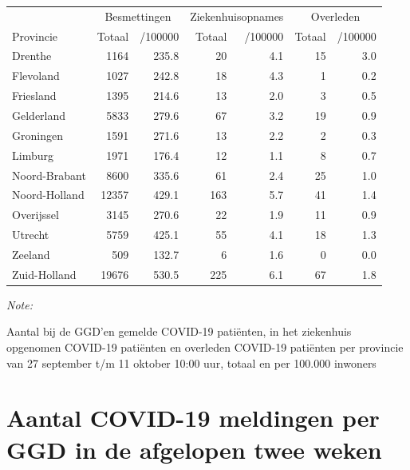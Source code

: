 \documentclass[
  english,
  man,floatsintext]{apa6}
\begin{document}
\begin{table}[H]
\centering
\begin{threeparttable}
\begin{tabular}{lrrrrrr}
\toprule
\multicolumn{1}{c}{ } & \multicolumn{2}{c}{Besmettingen} & \multicolumn{2}{c}{Ziekenhuisopnames} & \multicolumn{2}{c}{Overleden} \\
\cmidrule(l{3pt}r{3pt}){2-3} \cmidrule(l{3pt}r{3pt}){4-5} \cmidrule(l{3pt}r{3pt}){6-7}
Provincie & Totaal & /100000 & Totaal & /100000 & Totaal & /100000\\
\midrule
Drenthe & 1164 & 235.8 & 20 & 4.1 & 15 & 3.0\\
Flevoland & 1027 & 242.8 & 18 & 4.3 & 1 & 0.2\\
Friesland & 1395 & 214.6 & 13 & 2.0 & 3 & 0.5\\
Gelderland & 5833 & 279.6 & 67 & 3.2 & 19 & 0.9\\
Groningen & 1591 & 271.6 & 13 & 2.2 & 2 & 0.3\\
Limburg & 1971 & 176.4 & 12 & 1.1 & 8 & 0.7\\
Noord-Brabant & 8600 & 335.6 & 61 & 2.4 & 25 & 1.0\\
Noord-Holland & 12357 & 429.1 & 163 & 5.7 & 41 & 1.4\\
Overijssel & 3145 & 270.6 & 22 & 1.9 & 11 & 0.9\\
Utrecht & 5759 & 425.1 & 55 & 4.1 & 18 & 1.3\\
Zeeland & 509 & 132.7 & 6 & 1.6 & 0 & 0.0\\
Zuid-Holland & 19676 & 530.5 & 225 & 6.1 & 67 & 1.8\\
\bottomrule
\end{tabular}
\begin{tablenotes}
\item \textit{Note: } 
\item Aantal bij de GGD’en gemelde COVID-19 patiënten, in het ziekenhuis opgenomen COVID-19 patiënten en overleden COVID-19 patiënten per provincie van 27 september t/m 11 oktober 10:00 uur, totaal en per 100.000 inwoners
\end{tablenotes}
\end{threeparttable}
\end{table}

\newpage

\hypertarget{aantal-covid-19-meldingen-per-ggd-in-de-afgelopen-twee-weken}{%
\section{Aantal COVID-19 meldingen per GGD in de afgelopen twee weken}\label{aantal-covid-19-meldingen-per-ggd-in-de-afgelopen-twee-weken}}
\end{document}
